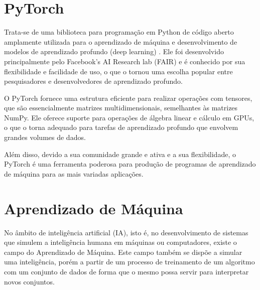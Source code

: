 

\section{PyTorch}

Trata-se de uma biblioteca para programação em Python de código aberto amplamente utilizada para o aprendizado de máquina e desenvolvimento de modelos de aprendizado profundo (deep learning) \cite{NEURIPS2019_9015}. Ele foi desenvolvido principalmente pelo Facebook's AI Research lab (FAIR) e é conhecido por sua flexibilidade e facilidade de uso, o que o tornou uma escolha popular entre pesquisadores e desenvolvedores de aprendizado profundo.

O PyTorch fornece uma estrutura eficiente para realizar operações com tensores, que são essencialmente matrizes multidimensionais, semelhantes às matrizes NumPy. Ele oferece suporte para operações de álgebra linear e cálculo em GPUs, o que o torna adequado para tarefas de aprendizado profundo que envolvem grandes volumes de dados.

Além disso, devido a sua comunidade grande e ativa e a sua flexibilidade, o PyTorch é uma ferramenta poderosa para produção de programas de aprendizado de máquina para as mais variadas aplicações.

\section{Aprendizado de Máquina}

No âmbito de inteligência artificial (IA), isto é, no desenvolvimento de sistemas que simulem a inteligência humana em máquinas ou computadores, existe o campo do Aprendizado de Máquina. Este campo também se dispõe a simular uma inteligência, porém a partir de um processo de treinamento de um algoritmo com um conjunto de dados de forma que o mesmo possa servir para interpretar novos conjuntos.

